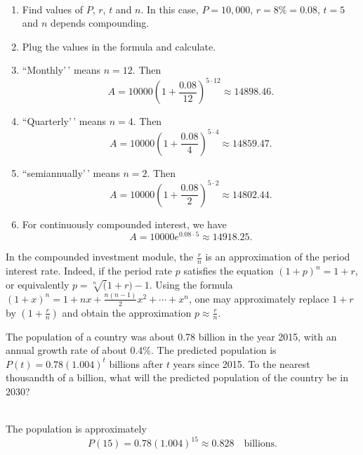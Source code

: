 \documentclass[
  en,11pt]{elegantbook}
\newcommand{\size}[2]{{\fontsize{#1}{0}\selectfont#2}}
\newenvironment{rmdnote}{
	\vspace*{0.5\baselineskip}
    \par\noindent
    \makebox[-3pt][r]{\color{red!90}\size{8}{\textdbend}\,\,}
    \begin{tcolorbox}[
    title={\textbf{\color{second}Note}},
    title style={left color=blue!10!green!20!white,right color=yellow!20!blue!20!white},
    colback=red!10!white,
    ]
    \itshape
}{
    \end{tcolorbox}
    \par\ignorespacesafterend
}
\let\BeginKnitrBlock\begin \let\EndKnitrBlock\end
\begin{document}
\BeginKnitrBlock{solution}
{}\\

\begin{enumerate}
\def\labelenumi{\arabic{enumi}.}

\item
  Find values of \(P\), \(r\), \(t\) and \(n\). In this case, \(P=10,000\), \(r=8\%=0.08\), \(t=5\) and \(n\) depends compounding.
\item
  Plug the values in the formula and calculate.
\item
  ``Monthly'\,' means \(n=12\). Then
  \[
   A=10000\left(1+\frac{0.08}{12}\right)^{5\cdot 12}\approx 14898.46.
   \]
\item
  ``Quarterly'\,' means \(n=4\). Then
  \[
   A=10000\left(1+\frac{0.08}{4}\right)^{5\cdot 4}\approx 14859.47.
   \]
\item
  ``semiannually'\,' means \(n=2\). Then
  \[
   A=10000\left(1+\frac{0.08}{2}\right)^{5\cdot 2}\approx 14802.44.
   \]
\item
  For continuously compounded interest, we have
  \[
   A=10000e^{0.08\cdot 5}\approx 14918.25.
   \]
\end{enumerate}
\EndKnitrBlock{solution}

\begin{rmdnote}

In the compounded investment module, the \(\frac rn\) is an approximation of the period interest rate. Indeed, if the period rate \(p\) satisfies the equation \((1+p)^n=1+r\), or equivalently \(p=\sqrt[n](1+r) - 1\). Using the formula \((1+x)^n=1+nx+\frac{n(n-1)}{2}x^2+\cdots +x^n\), one may approximately replace \(1+r\) by \((1+\frac rn)\) and obtain the approximation \(p\approx \frac rn\).

\end{rmdnote}

\BeginKnitrBlock{example}
\protect\hypertarget{exm:unnamed-chunk-284}{}{\label{exm:unnamed-chunk-284} }
The population of a country was about 0.78 billion in the year 2015, with an annual growth rate of about 0.4\%.
The predicted population is \(P(t)=0.78(1.004)^t\) billions after \(t\) years since 2015.
To the nearest thousandth of a billion, what will the predicted population of the country be in 2030?
\EndKnitrBlock{example}

\BeginKnitrBlock{solution}
{}\\

The population is approximately
\[
P(15)=0.78(1.004)^{15}\approx 0.828 \quad \text{billions}.
\]
\EndKnitrBlock{solution}
\end{document}
